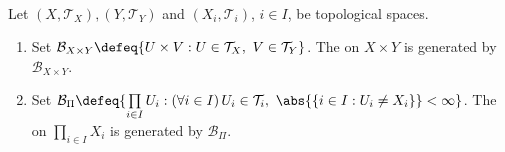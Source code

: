 \begin{definition} \label{def:product-topology} \\
Let $(X,\mathcal{T}_X),(Y,\mathcal{T}_Y)$ and $(X_i,\mathcal{T}_i)$, $i\in I$, be topological spaces.
\begin{enumerate}[label=(\roman*)]
\setlength{\itemsep}{0pt}
\item Set $\mathcal{B}_{X\times Y}\defeq\{U\times V:U\in\mathcal{T}_X,\ V\in\mathcal{T}_Y\}$. The  on $X\times Y$ is generated by $\mathcal{B}_{X\times Y}$.
\item Set $\mathcal{B}_{\Pi}\defeq\{\prod\limits_{i\in I}U_i:(\forall i\in I)\,U_i\in\mathcal{T}_i,\ \abs{\{i\in I:U_i\neq X_i\}}<\infty\}$. The  on $\prod\limits_{i\in I}X_i$ is generated by $\mathcal{B}_{\Pi}$.
\end{enumerate}
\end{definition}

